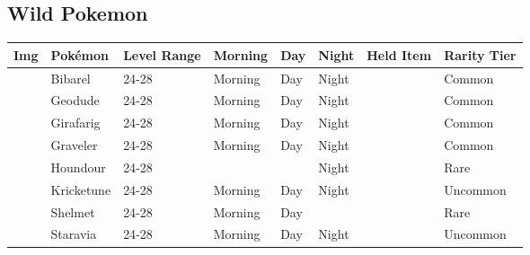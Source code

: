 \subsection{Wild Pokemon}%
\label{subsec:WildPokemon}%
\begin{longtable}{||l l l l l l l l||}%
\hline%
Img&Pokémon&Level Range&Morning&Day&Night&Held Item&Rarity Tier\\%
\hline%
\endhead%
\hline%
&Bibarel&24{-}28&Morning&Day&Night&&Common\\%
\hline%
&Geodude&24{-}28&Morning&Day&Night&&Common\\%
\hline%
&Girafarig&24{-}28&Morning&Day&Night&&Common\\%
\hline%
&Graveler&24{-}28&Morning&Day&Night&&Common\\%
\hline%
&Houndour&24{-}28&&&Night&&Rare\\%
\hline%
&Kricketune&24{-}28&Morning&Day&Night&&Uncommon\\%
\hline%
&Shelmet&24{-}28&Morning&Day&&&Rare\\%
\hline%
&Staravia&24{-}28&Morning&Day&Night&&Uncommon\\%
\hline%
\end{longtable}